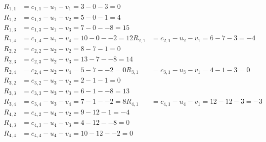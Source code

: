\[
\begin{aligned}
R_{1,1} &= c_{1,1} - u_{1} - v_{1} = 3 - 0 - 3 = 0 \\
R_{1,2} &= c_{1,2} - u_{1} - v_{2} = 5 - 0 - 1 = 4 \\
R_{1,3} &= c_{1,3} - u_{1} - v_{3} = 7 - 0 - -8 = 15 \\
R_{1,4} &= c_{1,4} - u_{1} - v_{4} = 10 - 0 - -2 = 12 
R_{2,1} &= c_{2,1} - u_{2} - v_{1} = 6 - 7 - 3 = -4 \\
R_{2,2} &= c_{2,2} - u_{2} - v_{2} = 8 - 7 - 1 = 0 \\
R_{2,3} &= c_{2,3} - u_{2} - v_{3} = 13 - 7 - -8 = 14 \\
R_{2,4} &= c_{2,4} - u_{2} - v_{4} = 5 - 7 - -2 = 0 
R_{3,1} &= c_{3,1} - u_{3} - v_{1} = 4 - 1 - 3 = 0 \\
R_{3,2} &= c_{3,2} - u_{3} - v_{2} = 2 - 1 - 1 = 0 \\
R_{3,3} &= c_{3,3} - u_{3} - v_{3} = 6 - 1 - -8 = 13 \\
R_{3,4} &= c_{3,4} - u_{3} - v_{4} = 7 - 1 - -2 = 8 
R_{4,1} &= c_{4,1} - u_{4} - v_{1} = 12 - 12 - 3 = -3 \\
R_{4,2} &= c_{4,2} - u_{4} - v_{2} = 9 - 12 - 1 = -4 \\
R_{4,3} &= c_{4,3} - u_{4} - v_{3} = 4 - 12 - -8 = 0 \\
R_{4,4} &= c_{4,4} - u_{4} - v_{4} = 10 - 12 - -2 = 0 
\end{aligned}
\]

